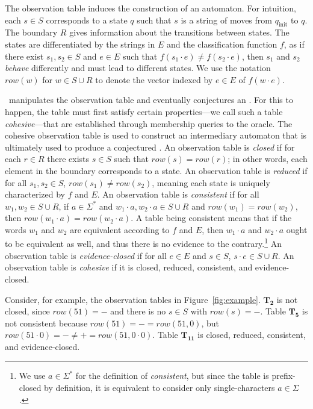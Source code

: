 The observation table induces the construction of an automaton.
For intuition,
each $s \in S$ corresponds to a state $q$ 
such that $s$ is a string of moves
from $q_\text{init}$ to $q$.
The boundary $R$ gives information about the 
transitions between states.
The states are differentiated by the 
strings in $E$ and the classification function $f$,
as if there exist $s_1, s_2 \in S$ and $e \in E$
such that $f(s_1 \cdot e) \neq f(s_2 \cdot e)$,
then $s_1$ and $s_2$ \emph{behave} differently 
and must lead to different states.
We use the notation $\textit{row}(w)$ for $w \in S \cup R$
to denote the vector indexed by $e \in E$ of $f(w \cdot e)$.

\alg\ manipulates the observation table and eventually
conjectures an \SFA.  For this to happen, the table must first satisfy certain properties---we
call such a table \emph{cohesive}---that
are established through membership queries to the oracle.
The cohesive observation table is used
to construct an intermediary automaton
that is ultimately used to produce a conjectured \SFA.
An observation table is \emph{closed} 
if for each $r \in R$ there exists $s \in S$
such that $\textit{row}(s) = \textit{row}(r)$;
in other words, each element in the boundary
corresponds to a state.
%
An observation table is \emph{reduced}
if for all $s_1, s_2 \in S$,
$\textit{row}(s_1) \neq \textit{row}(s_2)$,
meaning each state is uniquely characterized by $f$ and $E$.
%
An observation table is \emph{consistent}
if for all $w_1, w_2 \in S \cup R$,
if $a \in \Sigma^*$ and $w_1 \cdot a, w_2 \cdot a \in S \cup R$
and $\textit{row}(w_1) = \textit{row}(w_2)$, then
$\textit{row}(w_1 \cdot a) = \textit{row}(w_2 \cdot a)$.
%
A table being consistent means that if the words $w_1$ and $w_2$
are equivalent according to $f$ and $E$,
then $w_1 \cdot a$ and $w_2 \cdot a$ ought to be
equivalent as well, and thus
there is no evidence to the contrary.\footnote{We
use $a \in \Sigma^*$ for the definition
of \emph{consistent}, but since the table
is prefix-closed by definition,
it is equivalent to consider
only single-characters $a \in \Sigma$.}
%
An observation table is \emph{evidence-closed}
if for all $e \in E$ and $s \in S$,
$s \cdot e \in S \cup R$.
%
An observation table is \emph{cohesive}
if it is closed, reduced, consistent, and evidence-closed.

Consider, for example, the observation tables in Figure~\ref{fig:example}.
$\mathbf{T_2}$  is not closed, since $\textit{row}(51) = -$
and there is no $s \in S$ with $\textit{row}(s) = -$.
Table $\mathbf{T_5}$ is not
consistent because $\textit{row}(51) = - = \textit{row}(51,0)$,
but $\textit{row}(51\cdot0) = - \neq + = \textit{row}(51,0\cdot0)$.
Table $\mathbf{T_{11}}$ is closed, reduced, consistent, and evidence-closed.

